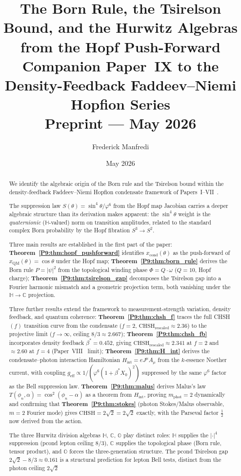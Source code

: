 \documentclass[11pt,a4paper]{article}
\title{\textbf{The Born Rule, the Tsirelson Bound, and the Hurwitz Algebras
  from the Hopf Push-Forward}
\\[0.6em]
{\large Companion Paper~IX to the Density-Feedback
Faddeev--Niemi Hopfion Series}
\\[0.6em]
\large Preprint --- May 2026}
\author{Frederick Manfredi}
\date{May 2026}
\theoremstyle{definition}
\theoremstyle{remark}
\newcommand{\vp}{\varphi}
\newcommand{\bst}{\beta^{*}}
\newcommand{\CC}{\mathbb{C}}
\newcommand{\HH}{\mathbb{H}}
\newcommand{\OO}{\mathbb{O}}
\newcommand{\xcond}{x_{\mathrm{cond}}}
\newcommand{\CHSH}{\mathrm{CHSH}}
\newcommand{\Tsirelson}{2\sqrt{2}}
\begin{document}
\maketitle
 
\begin{abstract}
We identify the algebraic origin of the Born rule and the Tsirelson bound
within the density-feedback Faddeev--Niemi Hopfion condensate framework
of Papers~I--VII~\cite{Paper1,Paper2,Paper3,Paper4,Paper5,Paper6,Paper7}.

The suppression law $S(\theta)=\sin^4\theta/\vp^6$ from the Hopf map Jacobian
carries a deeper algebraic structure than its derivation makes apparent:
the $\sin^4\theta$ weight is the \emph{quaternionic} ($\HH$-valued) norm
on transition amplitudes, related to the standard complex Born probability
by the Hopf fibration $S^3\to S^2$.

Three main results are established in the first part of the paper:
\textbf{Theorem~\ref{P9:thm:hopf_pushforward}} identifies $\xcond(\theta)$
as the push-forward of $x_\mathrm{QM}(\theta)=\cos\theta$ under the Hopf map;
\textbf{Theorem~\ref{P9:thm:born_rule}} derives the Born rule $P=|\psi|^2$ from
the topological winding phase $\Phi=Q\cdot\omega$ ($Q=10$, Hopf charge);
\textbf{Theorem~\ref{P9:thm:tsirelson_gap}} decomposes the Tsirelson gap into a
Fourier harmonic mismatch and a geometric projection term, both vanishing under
the $\HH\to\CC$ projection.

Three further results extend the framework to measurement-strength variation,
density feedback, and quantum coherence:
\textbf{Theorem~\ref{P9:thm:chsh_f}} traces the full CHSH$(f)$ transition curve
from the condensate ($f=2$, $\CHSH_\mathrm{rescaled}\approx2.36$) to the
projective limit ($f\to\infty$, ceiling $8/3\approx2.667$);
\textbf{Theorem~\ref{P9:thm:chsh_fb}} incorporates density feedback $\beta^*=0.452$,
giving $\CHSH_\mathrm{rescaled}\approx2.341$ at $f=2$ and $\approx2.60$ at $f=4$
(Paper~VIII~\cite{Paper8} limit);
\textbf{Theorem~\ref{P9:thm:H_int}} derives the condensate--photon interaction
Hamiltonian $H_\mathrm{int}=eJ^\mu A_\mu$ from the $k$-essence Noether current,
with coupling $g_\mathrm{eff}\propto 1/(\vp^6(1+\bst X_0)^2)$ suppressed by the
same $\vp^6$ factor as the Bell suppression law.
\textbf{Theorem~\ref{P9:thm:malus}} derives Malus's law
$T(\phi_n,\alpha)=\cos^2(\phi_n-\alpha)$ as a theorem from $H_\mathrm{int}$,
proving $m_\mathrm{phot}=2$ dynamically and confirming that
\textbf{Theorem~\ref{P9:thm:stokes}} (photon Stokes/Malus observable,
$m=2$ Fourier mode) gives $\CHSH=2\sqrt{2}=\Tsirelson$ exactly,
with the Parseval factor $\tfrac{1}{2}$ now derived from the action.

The three Hurwitz division algebras $\HH$, $\CC$, $\OO$ play distinct roles:
$\HH$ supplies the $|\cdot|^4$ suppression (pcond lepton ceiling $8/3$),
$\CC$ supplies the topological phase (Born rule, tensor product),
and $\OO$ forces the three-generation structure.
The pcond Tsirelson gap $2\sqrt{2}-8/3\approx0.161$ is a structural
prediction for lepton Bell tests, distinct from the photon ceiling $2\sqrt{2}$
\end{abstract}
 
\end{document}

